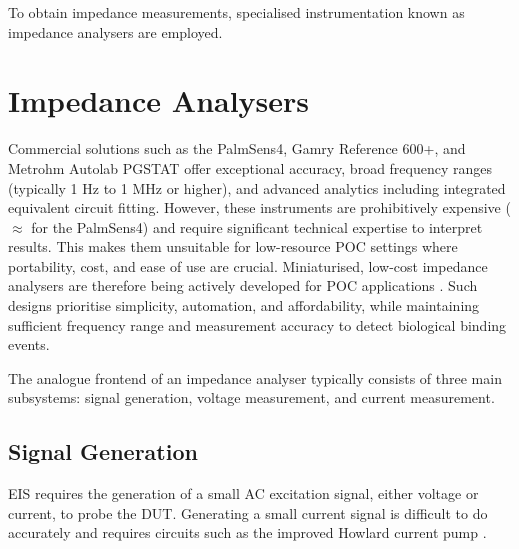 To obtain impedance measurements, specialised instrumentation known as impedance analysers are employed.

\section{Impedance Analysers}

Commercial solutions such as the PalmSens4, Gamry Reference 600+, and Metrohm Autolab PGSTAT offer exceptional accuracy, broad frequency ranges (typically 1 Hz to 1 MHz or higher), and advanced analytics including integrated equivalent circuit fitting. However, these instruments are prohibitively expensive ($\approx$  for the PalmSens4) and require significant technical expertise to interpret results. This makes them unsuitable for low-resource \ac{POC} settings where portability, cost, and ease of use are crucial. Miniaturised, low-cost impedance analysers are therefore being actively developed for POC applications \cite{buscagliaSimpleZLowCostPortable2023, al-aliDesignPortableLowCost2017, ibrahimCMOSTransimpedanceAmplifier}. Such designs prioritise simplicity, automation, and affordability, while maintaining sufficient frequency range and measurement accuracy to detect biological binding events.

The analogue frontend of an impedance analyser typically consists of three main subsystems: signal generation, voltage measurement, and current measurement.
\subsection{Signal Generation}
\Ac{EIS} requires the generation of a small AC excitation signal, either voltage or current, to probe the \ac{DUT}. Generating a small current signal is difficult to do accurately and requires circuits such as the improved Howlard current pump \cite{ImprovedHowlandCurrent2020}. 

